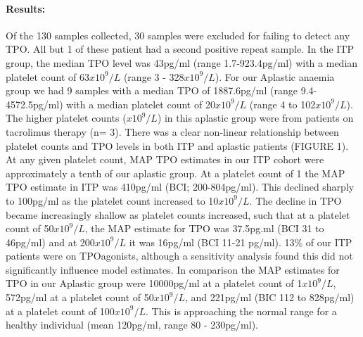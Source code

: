\documentclass[11pt]{article}
\begin{document}
\paragraph{Results:} Of the 130 samples collected, 30 samples were excluded for failing to detect any TPO. All but 1 of these patient had a second positive repeat sample. In the ITP group, the median TPO level was 43pg/ml (range 1.7-923.4pg/ml) with a median platelet count of 63$x10^9/L$ (range 3 - 328$x10^9/L$). For our Aplastic anaemia group we had 9 samples with a median TPO of 1887.6pg/ml (range 9.4-4572.5pg/ml) with a median platelet count of 20$x10^9/L$ (range 4 to 102$x10^9/L$). The higher platelet counts ($x10^9/L$) in this aplastic group were from patients on tacrolimus therapy (n= 3). There was a clear non-linear relationship between platelet counts and TPO levels in both ITP and aplastic patients (FIGURE 1). At any given platelet count, MAP TPO estimates in our ITP cohort were approximately a tenth of our aplastic group.  At a platelet count of 1 the MAP TPO estimate in ITP was 410pg/ml (BCI; 200-804pg/ml). This declined sharply to 100pg/ml as the platelet count increased to 10$x10^9/L$. The decline in TPO became increasingly shallow as platelet counts increased, such that at a platelet count of 50$x10^9/L$, the MAP estimate for TPO was 37.5pg.ml (BCI 31 to 46pg/ml) and at 200$x10^9/L$ it was 16pg/ml (BCI 11-21 pg/ml). 13\% of our ITP patients were on TPOagonists, although a sensitivity analysis found this did not significantly influence model estimates. In comparison the MAP estimates for TPO in our Aplastic group were \geqslant10000pg/ml at a platelet count of 1$x10^9/L$, 572pg/ml at a platelet count of 50$x10^9/L$, and 221pg/ml (BIC 112 to 828pg/ml) at a platelet count of 100$x10^9/L$. This is approaching the normal range for a healthy individual (mean 120pg/ml, range 80 - 230pg/ml).

\end{document}
